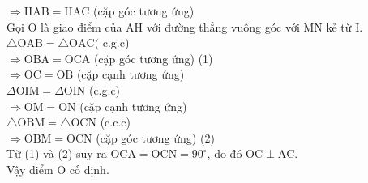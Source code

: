 \begin{bt}
{\begin{enumerate}
        $\Rightarrow \mathrm{HAB}=\mathrm{HAC}$ (cặp góc tương ứng)\\
        Gọi $\mathrm{O}$ là giao điểm của $\mathrm{AH}$ với đường thẳng vuông góc với $\mathrm{MN}$ kẻ từ $\mathrm{I}$.\\
        $\triangle \mathrm{OAB}=\triangle \mathrm{OAC}($ c.g.c)\\
        $\Rightarrow \mathrm{OBA}=\mathrm{OCA}$ (cặp góc tương ứng) (1)\\
        $\Rightarrow \mathrm{OC}=\mathrm{OB}$ (cặp cạnh tương ứng)\\
        $\Delta \mathrm{OIM}=\Delta \mathrm{OIN}$ (c.g.c)\\
        $\Rightarrow \mathrm{OM}=\mathrm{ON}$ (cặp cạnh tương ứng)\\
        $\triangle \mathrm{OBM}=\triangle \mathrm{OCN}$ (c.c.c)\\
        $\Rightarrow \mathrm{OBM}=\mathrm{OCN}$ (cặp góc tương ứng) (2)\\
        Từ (1) và (2) suy ra $\mathrm{OCA}=\mathrm{OCN}=90^{\circ}$, do đó $\mathrm{OC} \perp \mathrm{AC}$.\\
        Vậy điểm $\mathrm{O}$ cố định.
    \end{enumerate}
}
\end{bt}

